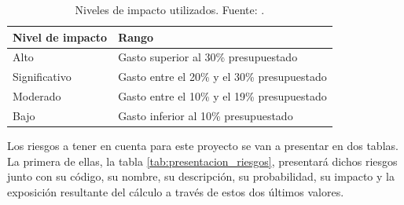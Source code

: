 \documentclass{subfiles}
\begin{document}
\begin{table}[ht]
\centering
\begin{tabular}{ll}
\hline
\textbf{Nivel de impacto} & \textbf{Rango}                              \\ \hline
Alto                      & Gasto superior al 30\% presupuestado        \\ \hline
Significativo             & Gasto entre el 20\% y el 30\% presupuestado \\ \hline
Moderado                  & Gasto entre el 10\% y el 19\% presupuestado \\ \hline
Bajo                      & Gasto inferior al 10\% presupuestado        \\ \hline
\end{tabular}
\caption[Niveles de impacto utilizados.]{Niveles de impacto utilizados. Fuente: .}
\label{tab:impacto_de_riesgos}
\end{table}

        Los riesgos a tener en cuenta para este proyecto se van a presentar en dos tablas. La primera de ellas, la tabla \ref{tab:presentacion_riesgos}, presentará dichos riesgos junto con su código, su nombre, su descripción, su probabilidad, su impacto y la exposición resultante del cálculo a través de estos dos últimos valores.

\end{document}
